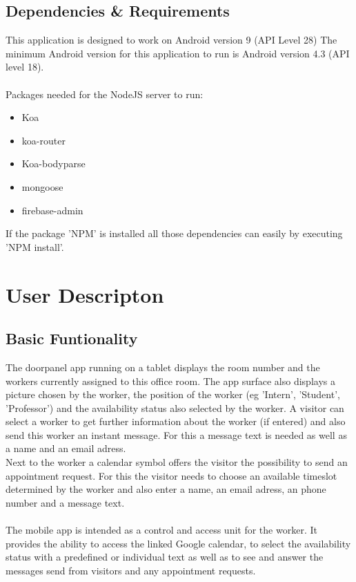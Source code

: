\documentclass[article,colorback,accentcolor=tud4c, 11pt]{tudreport}
\begin{document}
\subsection{Dependencies \& Requirements}
This application is designed to work on Android version 9 (API Level 28)
The minimum Android version for this application to run is Android version 4.3 (API level 18). \\ \\
Packages needed for the NodeJS server to run:\\
\begin{itemize}
	\item Koa
	\item koa-router
	\item Koa-bodyparse
	\item mongoose
	\item firebase-admin
\end{itemize}

If the package 'NPM' is installed all those dependencies can easily by executing 'NPM install'.\\

	
\section{User Descripton}

	
\subsection{Basic Funtionality}
The doorpanel app running on a tablet displays the room number and the workers currently assigned to this office room. The app surface also displays a picture chosen by the worker, the position of the worker (eg 'Intern', 'Student', 'Professor') and the availability status also selected by the worker.
A visitor can select a worker to get further information about the worker (if entered) and also send this worker an instant message. For this a message text is needed as well as a name and an email adress.\\

Next to the worker a calendar symbol offers the visitor the possibility to send an appointment request. For this the visitor needs to choose an available timeslot determined by the worker and also enter a name, an email adress, an phone number and a message text.\\ \\

The mobile app is intended as a control and access unit for the worker. It provides the ability to access the linked Google calendar, to select the availability status with a predefined or individual text as well as to see and answer the messages send from visitors and any appointment requests.\\
\end{document}
